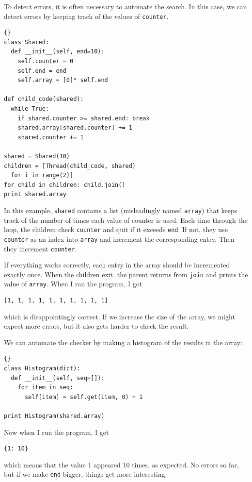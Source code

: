 \documentclass{book}
\begin{document}
To detect errors, it is often necessary to automate the search.
In this case, we can detect errors by keeping track of the values
of {\tt counter}.

\pagebreak
\begin{lstlisting}[title={}]{}
class Shared:
  def __init__(self, end=10):
    self.counter = 0
    self.end = end
    self.array = [0]* self.end

def child_code(shared):
  while True:
    if shared.counter >= shared.end: break
    shared.array[shared.counter] += 1
    shared.counter += 1

shared = Shared(10)
children = [Thread(child_code, shared) 
  for i in range(2)]
for child in children: child.join()
print shared.array
\end{lstlisting}

In this example, {\tt shared} contains a list (misleadingly
named {\tt array}) that keeps track of the number of times
each value of counter is used.
Each time through the loop, the children check {\tt counter}
and quit if it exceeds {\tt end}.  If not, they use {\tt counter}
as an index into {\tt array} and increment the corresponding
entry.  Then they increment {\tt counter}.

If everything works correctly, each entry in the array should
be incremented exactly once.  When the children exit, the parent
returns from {\tt join} and prints the value of {\tt array}.
When I ran the program, I got
%
\begin{verbatim}
[1, 1, 1, 1, 1, 1, 1, 1, 1, 1]
\end{verbatim}
%
which is disappointingly correct.  If we increase the size of
the array, we might expect more errors, but it also gets harder
to check the result.

\newpage
We can automate the checker by making
a histogram of the results in the array:

\begin{lstlisting}[title={}]{}
class Histogram(dict):
  def __init__(self, seq=[]):
    for item in seq:
      self[item] = self.get(item, 0) + 1

print Histogram(shared.array)
\end{lstlisting}

Now when I run the program, I get

\begin{verbatim}
{1: 10}
\end{verbatim}
%
which means that the value 1 appeared 10 times, as expected.  No
errors so far, but if we make {\tt end} bigger, things get more
interesting:
\end{document}
